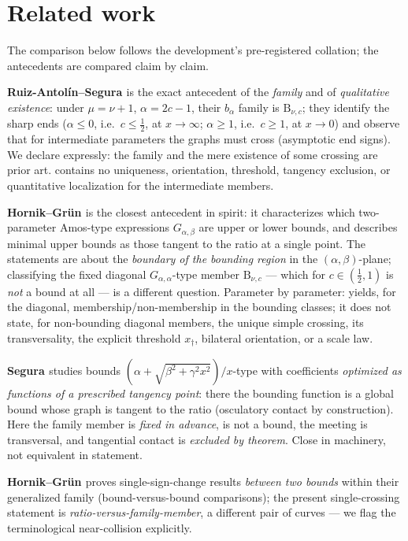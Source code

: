 \documentclass[11pt]{article}
\newcommand{\Bfam}{\mathrm{B}}
\begin{document}
\section{Related work}\label{sec:related}

The comparison below follows the development's pre-registered
collation; the antecedents are compared claim by claim.

\textbf{Ruiz-Antol\'in--Segura \cite{RS16}} is the exact antecedent
of the \emph{family} and of \emph{qualitative existence}: under
$\mu = \nu+1$, $\alpha = 2c-1$, their $b_\alpha$ family is
$\Bfam_{\nu,c}$; they identify the sharp ends ($\alpha \le 0$,
i.e.\ $c \le \tfrac12$, at $x \to \infty$; $\alpha \ge 1$, i.e.\
$c \ge 1$, at $x \to 0$) and observe that for intermediate
parameters the graphs must cross (asymptotic end signs).  We
declare expressly: the family and the mere existence of some
crossing are prior art.  \cite{RS16} contains no uniqueness,
orientation, threshold, tangency exclusion, or quantitative
localization for the intermediate members.

\textbf{Hornik--Gr\"un \cite{HG13}} is the closest antecedent in
spirit: it characterizes which two-parameter Amos-type expressions
$G_{\alpha,\beta}$ are upper or lower bounds, and describes minimal
upper bounds as those tangent to the ratio at a single point.  The
statements are about the \emph{boundary of the bounding region} in
the $(\alpha,\beta)$-plane; classifying the fixed diagonal
$G_{\alpha,\alpha}$-type member $\Bfam_{\nu,c}$ --- which for
$c \in (\tfrac12,1)$ is \emph{not} a bound at all --- is a
different question.  Parameter by parameter: \cite{HG13} yields, for
the diagonal, membership/non-membership in the bounding classes; it
does not state, for non-bounding diagonal members, the unique
simple crossing, its transversality, the explicit threshold
$x_\dagger$, bilateral orientation, or a scale law.

\textbf{Segura \cite{Segura23}} studies bounds
$(\alpha+\sqrt{\beta^2+\gamma^2x^2})/x$-type with coefficients
\emph{optimized as functions of a prescribed tangency point}: there
the bounding function is a global bound whose graph is tangent to
the ratio (osculatory contact by construction).  Here the family
member is \emph{fixed in advance}, is not a bound, the meeting is
transversal, and tangential contact is \emph{excluded by theorem}.
Close in machinery, not equivalent in statement.

\textbf{Hornik--Gr\"un \cite{HG24}} proves single-sign-change
results \emph{between two bounds} within their generalized family
(bound-versus-bound comparisons); the present single-crossing
statement is \emph{ratio-versus-family-member}, a different pair of
curves --- we flag the terminological near-collision explicitly.
\end{document}
